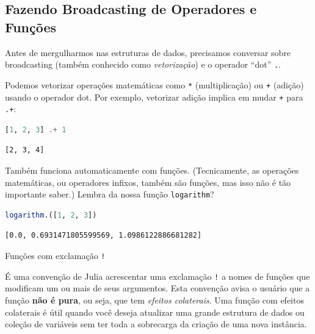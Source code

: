 \documentclass[
  notoc %
]{tufte-book}
\makeatletter
\newcommand{\passthrough}[1]{#1}
\renewcommand\subsubsection{%
\@startsection{subsubsection}{3}{\z@ }{-3.25ex\@plus -1ex \@minus -.2ex}{1.5ex \@plus .2ex}{\normalfont \normalsize \bfseries }
}
\makeatother
\begin{document}
\hypertarget{sec:broadcasting}{%
\subsection{Fazendo Broadcasting de Operadores e
Funções}\label{sec:broadcasting}}

Antes de mergulharmos nas estruturas de dados, precisamos conversar
sobre broadcasting (também conhecido como \emph{vetorização}) e o
operador ``dot'' \passthrough{\lstinline!.!}.

Podemos vetorizar operações matemáticas como \passthrough{\lstinline!*!}
(multiplicação) ou \passthrough{\lstinline!+!} (adição) usando o
operador dot. Por exemplo, vetorizar adição implica em mudar
\passthrough{\lstinline!+!} para \passthrough{\lstinline!.+!}:

\begin{lstlisting}[language=Julia]
[1, 2, 3] .+ 1
\end{lstlisting}

\begin{lstlisting}[language=Output]
[2, 3, 4]
\end{lstlisting}

Também funciona automaticamente com funções. (Tecnicamente, as operações
matemáticas, ou operadores infixos, também são funções, mas isso não é
tão importante saber.) Lembra da nossa função
\passthrough{\lstinline!logarithm!}?

\begin{lstlisting}[language=Julia]
logarithm.([1, 2, 3])
\end{lstlisting}

\begin{lstlisting}[language=Output]
[0.0, 0.6931471805599569, 1.0986122886681282]
\end{lstlisting}

\hypertarget{sec:function_bang}{%
\subsubsection{\texorpdfstring{Funções com exclamação
\texttt{!}}{Funções com exclamação !}}\label{sec:function_bang}}

É uma convenção de Julia acrescentar uma exclamação
\passthrough{\lstinline"!"} a nomes de funções que modificam um ou mais
de seus argumentos. Esta convenção avisa o usuário que a função
\textbf{não é pura}, ou seja, que tem \emph{efeitos colaterais}. Uma
função com efeitos colaterais é útil quando você deseja atualizar uma
grande estrutura de dados ou coleção de variáveis sem ter toda a
sobrecarga da criação de uma nova instância.
\end{document}
